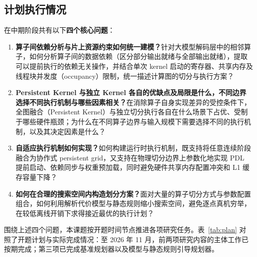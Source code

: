 \subsection{计划执行情况}

在中期阶段共有以下\textbf{四个核心问题}：
\begin{enumerate}[leftmargin=2.4em,itemsep=3pt]
\item \textbf{算子间依赖分析与片上资源约束如何统一建模？}针对大模型解码层中的相邻算子，如何分析算子间的数据依赖（区分部分输出就绪与全部输出就绪），提取可以提前执行的依赖无关操作，并结合单次 kernel 启动的寄存器、共享内存及线程块并发度（occupancy）限制，统一描述计算图的切分与执行方案？
\item \textbf{Persistent Kernel 与独立 Kernel 各自的优缺点及局限是什么，不同边界选择不同执行机制与哪些因素相关？}在消除算子自身实现差异的受控条件下，全图融合（Persistent Kernel）与独立切分执行各自在什么场景下占优、受制于哪些硬件瓶颈；为什么在不同算子边界与输入规模下需要选择不同的执行机制，以及其决定因素是什么？
\item \textbf{自适应执行机制如何实现？}如何构建运行时执行机制，既支持将任意连续阶段融合为协作式 persistent grid，又支持在物理切分边界上参数化地实现 PDL 提前启动、依赖同步与权重预加载，同时避免硬件共享内存配置冲突和 L1 缓存容量下降？
\item \textbf{如何在合理的搜索空间内构造划分方案？}面对大量的算子切分方式与参数配置组合，如何利用解析代价模型与静态规则缩小搜索空间，避免逐点真机穷举，在较低离线开销下求得接近最优的执行计划？
\end{enumerate}

围绕上述四个问题，本课题按开题时间节点推进各项研究任务。表~\ref{tab:plan} 对照了开题计划与实际完成情况：至 2026 年 11 月，前两项研究内容的主体工作已按期完成；第三项已完成基准规划器以及模型与静态规则引导规划器。

